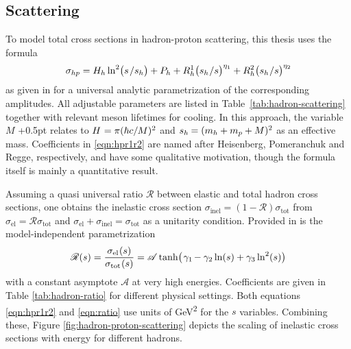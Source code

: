 \begin{spacing}{0.975}
	
	
	\subsection{Scattering}
	\label{sub:scattering}
	
	\enlargethispage*{2\baselineskip}

	To model total cross sections in hadron-proton scattering, this thesis uses the formula
	\begin{equation}
		\sigma_{hp} = H_h \ln^2 \bigl( s \kern+1.0pt / s_h \bigr) + P_h +
		R_h^1 \bigl( s_h \kern+0.5pt / s \bigr)^{\eta_1} + R_h^2 \bigl( s_h \kern+0.5pt / s \bigr)^{\eta_2}
		\label{eqn:hpr1r2}
	\end{equation}
	as given in \cite{Belousov_2016} for a universal analytic parametrization of the corresponding amplitudes.
	All adjustable parameters are listed in Table~\ref{tab:hadron-scattering} together with relevant meson lifetimes for
	cooling. In this approach, the variable $M$ \kern+0.5pt relates to $H \kern+0.5pt = \pi (\hbar c / M)^2$ and
	$s_h \kern-0.5pt = (m_h + m_p + M)^2$ as an effective mass. Coefficients in \eqref{eqn:hpr1r2} are named after Heisenberg,
	Pomeranchuk and Regge, respectively, and have some qualitative motivation, though the formula itself is mainly a quantitative
	result.
	\newpage
\end{spacing}



Assuming a quasi universal ratio $\mathscr{R}$ between elastic and total hadron cross sections, one obtains the inelastic
cross section $\sigma_\text{inel} = (1 - \mathscr{R}) \sigma_\text{tot}$ from $\sigma_\text{el} = \mathscr{R} \sigma_\text{tot}$
and $\sigma_\text{el} + \sigma_\text{inel} = \sigma_\text{tot}$ as a unitarity condition. Provided in \cite{Fagundes_2012} is
the model-independent parametrization
\begin{equation}
	\mathscr{R}(s) = \frac{\sigma_{\text{el}\kern+0.5pt} (s)}{\sigma_{\text{tot}\kern+0.5pt} (s)} =
	\mathscr{A} \tanh \bigl( \kern+1.0pt \gamma_1 \kern-1.0pt - \gamma_2 \ln (s) + \gamma_3 \ln^2 (s) \bigr)
	\label{eqn:ratio}
\end{equation}
with a constant asymptote $\mathscr{A}$ at very high energies. Coefficients are given in Table \ref{tab:hadron-ratio} for
different physical settings. Both equations \eqref{eqn:hpr1r2} and \eqref{eqn:ratio} use units of \unit{\giga\electronvolt\squared}
for the $s$  variables. Combining these, Figure \ref{fig:hadron-proton-scattering} depicts the scaling of inelastic cross sections
with energy for different hadrons.

